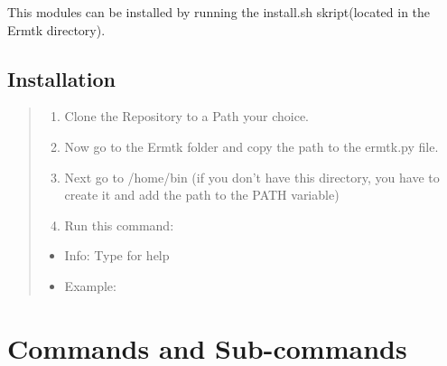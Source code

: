 \documentclass[letterpaper,10pt,english,openany,oneside]{sphinxmanual}
\begin{document}
This modules can be installed by running the install.sh skript(located in the Ermtk directory).
\newpage

\section{Installation}
\label{\detokenize{install:installation}}\begin{quote}
\begin{enumerate}
\def\theenumi{\arabic{enumi}}
\def\labelenumi{\theenumi .}
\makeatletter\def\p@enumii{\p@enumi \theenumi .}\makeatother
\item {} 
Clone the Repository to a Path your choice.

\item {} 
Now go to the Ermtk folder and copy the path to the ermtk.py file.

\item {} 
Next go to /home/bin (if you don’t have this directory, you have to create it and add the path to the PATH variable)

\item {} 
Run this command: 

\end{enumerate}
\begin{itemize}
\item {} 
Info: Type  for help

\item {} 
Example: 

\end{itemize}
\end{quote}


\chapter{Commands and Sub-commands}
\label{\detokenize{cmd:commands-and-sub-commands}}\label{\detokenize{cmd::doc}}
\begin{sphinxVerbatim}[commandchars=\\\{\}]
  \PYG{p}{[}\PYG{p}{]} \PYG{p}{[}\PYG{p}{]}
\end{sphinxVerbatim}
\end{document}
